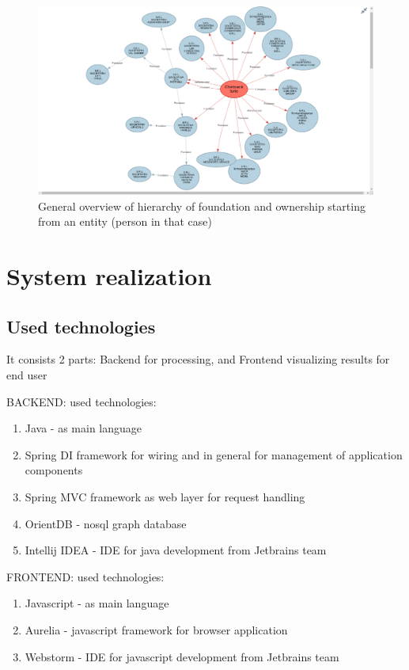\documentclass[12pt]{article}
\begin{document}
	
	\newpage
	\begin{figure}[!ht] 
	\renewcommand\thefigure{9} %
	\centering 
	\includegraphics[width=17cm]{graph.png} 
	\caption{ General overview of hierarchy of foundation and ownership starting from an entity (person in that case) }\label{fig4} 
	\end{figure}

\newpage
\section{System realization}

\subsection{Used technologies}
It consists 2 parts: Backend for processing, and Frontend visualizing results for end user

BACKEND:
used technologies:
\begin{enumerate}
\item Java - as main language
\item Spring DI framework for wiring and in general for management of application components
\item Spring MVC framework as web layer for request handling
\item OrientDB - nosql graph database
\item Intellij IDEA - IDE for java development from Jetbrains team
\end{enumerate}

FRONTEND:
used technologies:
\begin{enumerate}
\item Javascript - as main language
\item Aurelia - javascript framework for browser application
\item Webstorm - IDE for javascript development from Jetbrains team
\end{enumerate}
\end{document}

